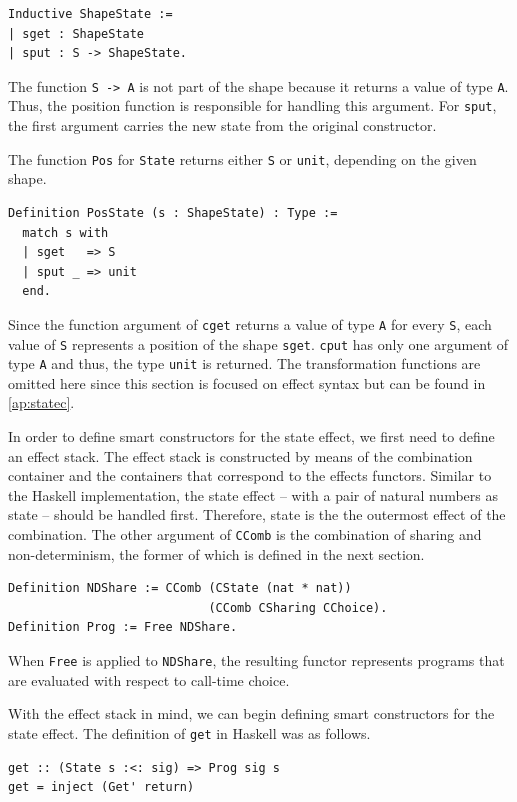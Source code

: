 \documentclass[a4paper, 11pt, fleqn, twoside, abstract=on]{scrreprt}
\newcommand{\hinl}[1]{\texttt{#1}}
\newcommand{\cinl}[1]{\texttt{#1}}
\begin{document}
\begin{verbatim}
Inductive ShapeState :=
| sget : ShapeState
| sput : S -> ShapeState.
\end{verbatim}
\noindent
The function \cinl{S -> A} is not part of the shape because it returns a value of type \cinl{A}.
Thus, the position function is responsible for handling this argument.
For \cinl{sput}, the first argument carries the new state from the original constructor.

The function \cinl{Pos} for \cinl{State} returns either \cinl{S} or \cinl{unit}, depending on the given shape.

\begin{verbatim}
Definition PosState (s : ShapeState) : Type :=
  match s with
  | sget   => S
  | sput _ => unit
  end.
\end{verbatim}
\noindent
Since the function argument of \cinl{cget} returns a value of type \cinl{A} for every \cinl{S}, each value of \cinl{S} represents a position of the shape \cinl{sget}.
\cinl{cput} has only one argument of type \cinl{A} and thus, the type \cinl{unit} is returned.
The transformation functions are omitted here since this section is focused on effect syntax but can be found in \autoref{ap:statec}.

In order to define smart constructors for the state effect, we first need to define an effect stack.
The effect stack is constructed by means of the combination container and the containers that correspond to the effects functors.
Similar to the Haskell implementation, the state effect -- with a pair of natural numbers as state -- should be handled first.
Therefore, state is the the outermost effect of the combination.
The other argument of \cinl{CComb} is the combination of sharing and non-determinism, the former of which is defined in the next section.
 
\begin{verbatim}
Definition NDShare := CComb (CState (nat * nat)) 
                            (CComb CSharing CChoice).
Definition Prog := Free NDShare.
\end{verbatim}
\noindent
When \cinl{Free} is applied to \cinl{NDShare}, the resulting functor represents programs that are evaluated with respect to call-time choice.

With the effect stack in mind, we can begin defining smart constructors for the state effect.
The definition of \hinl{get} in Haskell was as follows.

\begin{verbatim}
get :: (State s :<: sig) => Prog sig s
get = inject (Get' return)
\end{verbatim}
\end{document}
